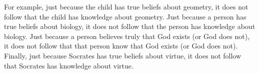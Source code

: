 \documentclass[10 pt]{article}
\begin{document}
For example, just because the child has true beliefs about geometry, it does not follow that the child has knowledge about geometry. Just because a person has true beliefs about biology, it does not follow that the person has knowledge about biology. Just because a person believes truly that God exists (or God does not), it does not follow that that person know that God exists (or God does not). Finally, just because Socrates has true beliefs about virtue, it does not follow that Socrates has knowledge about virtue. 

 
\end{document}
